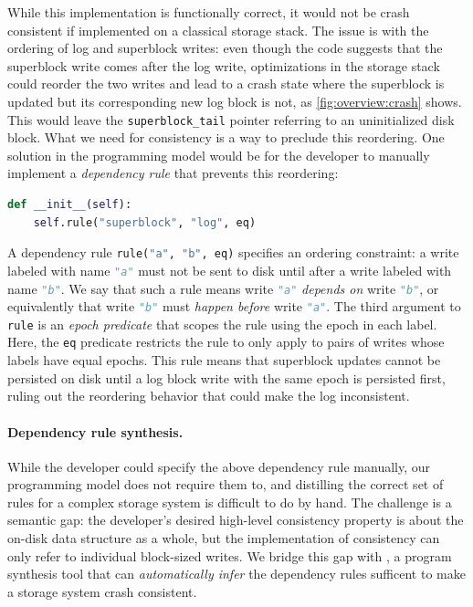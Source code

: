 While this implementation is functionally correct,
it would not be crash consistent if implemented on a classical storage stack.
The issue is with the ordering of log and superblock writes:
even though the code suggests that the superblock write comes after the log write,
optimizations in the storage stack could reorder the two writes
and lead to a crash state where the superblock is updated but its corresponding new log block is not,
as \cref{fig:overview:crash} shows.
This would leave the \texttt{superblock_tail} pointer referring to an uninitialized disk block.
What we need for consistency is a way to preclude this reordering.
One solution in the \depsynth programming model
would be for the developer to manually implement a \emph{dependency rule}
that prevents this reordering:
%
\begin{lstlisting}[language=py]
  def __init__(self):
    self.rule("superblock", "log", eq)
\end{lstlisting}
%
A dependency rule \lstinline[language=py]{rule("a", "b", eq)}
specifies an ordering constraint:
a write labeled with name \lstinline[language=py]{"a"}
must not be sent to disk until after a write labeled with name \lstinline[language=py]{"b"}.
We say that such a rule means write \lstinline[language=py]{"a"} \emph{depends on} write \lstinline[language=py]{"b"},
or equivalently that write \lstinline[language=py]{"b"} must \emph{happen before} write \lstinline[language=py]{"a"}.
The third argument to \lstinline[language=py]{rule}
is an \emph{epoch predicate} that scopes the rule using the epoch in each label.
Here, the \lstinline[language=py]{eq} predicate
restricts the rule to only apply to pairs of writes whose labels have equal epochs.
This rule means that superblock updates cannot be persisted on disk
until a log block write with the same epoch is persisted first,
ruling out the reordering behavior that could make the log inconsistent.\tighten


\paragraph{Dependency rule synthesis.}
While the developer could specify the above dependency rule manually,
our programming model does not require them to,
and distilling the correct set of rules for a complex storage system is difficult to do by hand.
The challenge is a semantic gap:
the developer's desired high-level consistency property is about the on-disk data structure as a whole,
but the implementation of consistency can only refer to individual block-sized writes.
We bridge this gap with \depsynth, a program synthesis tool
that can \emph{automatically infer} the dependency rules sufficent to make a storage system crash consistent.

